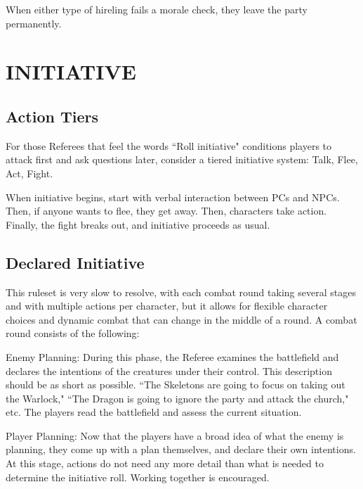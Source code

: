 \documentclass[twoside]{article}
\begin{document}
\bigbreak

When either type of hireling fails a morale check, they leave the party permanently.

\section*{INITIATIVE}

\subsection*{Action Tiers}

For those Referees that feel the words ``Roll initiative" conditions players to attack first and ask questions later, consider a tiered initiative system: Talk, Flee, Act, Fight. 

\bigbreak

When initiative begins, start with verbal interaction between PCs and NPCs. Then, if anyone wants to flee, they get away. Then, characters take action. Finally, the fight breaks out, and initiative proceeds as usual.

\subsection*{Declared Initiative}

This ruleset is very slow to resolve, with each combat round taking several stages and with multiple actions per character, but it allows for flexible character choices and dynamic combat that can change in the middle of a round. A combat round consists of the following:

\bigbreak

Enemy Planning: During this phase, the Referee examines the battlefield and declares the intentions of the creatures under their control. This description should be as short as possible. ``The Skeletons are going to focus on taking out the Warlock," ``The Dragon is going to ignore the party and attack the church," etc. The players read the battlefield and assess the current situation.

\bigbreak

Player Planning: Now that the players have a broad idea of what the enemy is planning, they come up with a plan themselves, and declare their own intentions. At this stage, actions do not need any more detail than what is needed to determine the initiative roll. Working together is encouraged.
\end{document}
